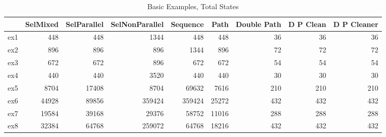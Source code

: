 \begin{table}
\centering
\caption{Basic Examples, Total States}
\label{b_e_total}
\begin{tabular}{lrrrrrrrr}
\toprule
{} &  SelMixed &  SelParallel &  SelNonParallel &  Sequence &   Path &  Double Path &  D P Clean &  D P Cleaner \\
\midrule
ex1 &       448 &          448 &            1344 &       448 &    448 &           36 &         36 &           36 \\
ex2 &       896 &          896 &             896 &      1344 &    896 &           72 &         72 &           72 \\
ex3 &       672 &          672 &             896 &       672 &    672 &           54 &         54 &           54 \\
ex4 &       440 &          440 &            3520 &       440 &    440 &           30 &         30 &           30 \\
ex5 &      8704 &        17408 &            8704 &     69632 &   7616 &          210 &        210 &          210 \\
ex6 &     44928 &        89856 &          359424 &    359424 &  25272 &          432 &        432 &          432 \\
ex7 &     19584 &        39168 &           29376 &     58752 &  11016 &          288 &        288 &          288 \\
ex8 &     32384 &        64768 &          259072 &     64768 &  18216 &          432 &        432 &          432 \\
\bottomrule
\end{tabular}
\end{table}
